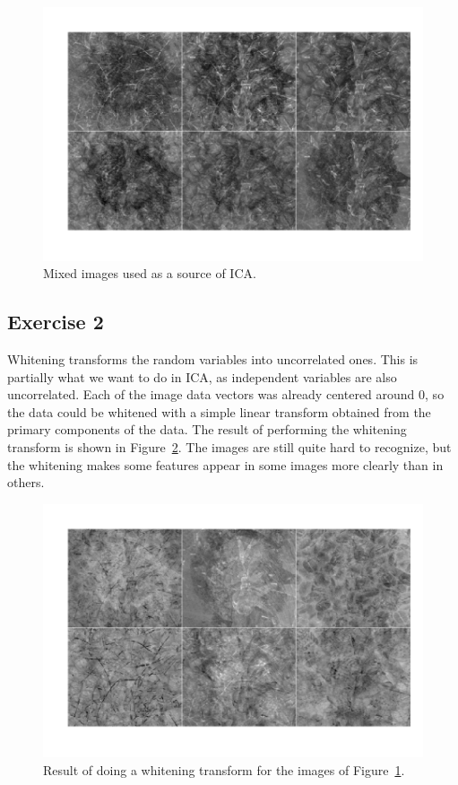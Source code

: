 \documentclass{article}
\begin{document}
\newcommand\iscale{0.45}
\begin{figure}\centering
	\includegraphics[scale=\iscale]{mixed}
	\caption{Mixed images used as a source of ICA.}\label{fig:mixed}
\end{figure}

\subsection{Exercise 2}
Whitening transforms the random variables into uncorrelated ones.
This is partially what we want to do in ICA, as independent variables are also uncorrelated.
Each of the image data vectors was already centered around 0, so the data could be whitened with a simple linear transform obtained from the primary components of the data.
The result of performing the whitening transform is shown in Figure~\ref{fig:white}.
The images are still quite hard to recognize, but the whitening makes some features appear in some images more clearly than in others.

\begin{figure}\centering
	\includegraphics[scale=\iscale]{white}
	\caption{Result of doing a whitening transform for the images of Figure~\ref{fig:mixed}.}\label{fig:white}
\end{figure}
\end{document}

